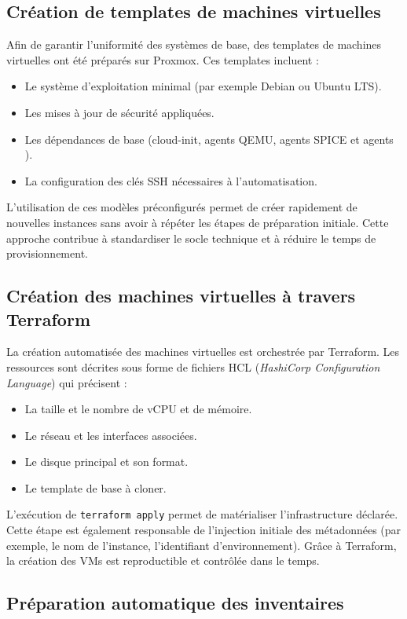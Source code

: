 \subsection{Création de templates de machines virtuelles}

Afin de garantir l'uniformité des systèmes de base, des templates de machines virtuelles ont été préparés sur Proxmox.
Ces templates incluent :
\begin{itemize}
	\item Le système d'exploitation minimal (par exemple Debian ou Ubuntu LTS).
	\item Les mises à jour de sécurité appliquées.
	\item Les dépendances de base (cloud-init, agents QEMU, agents SPICE et agents ).
	\item La configuration des clés SSH nécessaires à l'automatisation.
\end{itemize}

L'utilisation de ces modèles préconfigurés permet de créer rapidement de nouvelles instances sans avoir à répéter les étapes de préparation initiale.
Cette approche contribue à standardiser le socle technique et à réduire le temps de provisionnement.

\subsection{Création des machines virtuelles à travers Terraform}

La création automatisée des machines virtuelles est orchestrée par Terraform.
Les ressources sont décrites sous forme de fichiers HCL (\textit{HashiCorp Configuration Language}) qui précisent :
\begin{itemize}
	\item La taille et le nombre de vCPU et de mémoire.
	\item Le réseau et les interfaces associées.
	\item Le disque principal et son format.
	\item Le template de base à cloner.
\end{itemize}

L'exécution de \texttt{terraform apply} permet de matérialiser l'infrastructure déclarée.
Cette étape est également responsable de l'injection initiale des métadonnées (par exemple, le nom de l'instance, l'identifiant d'environnement).
Grâce à Terraform, la création des VMs est reproductible et contrôlée dans le temps.

\subsection{Préparation automatique des inventaires}


